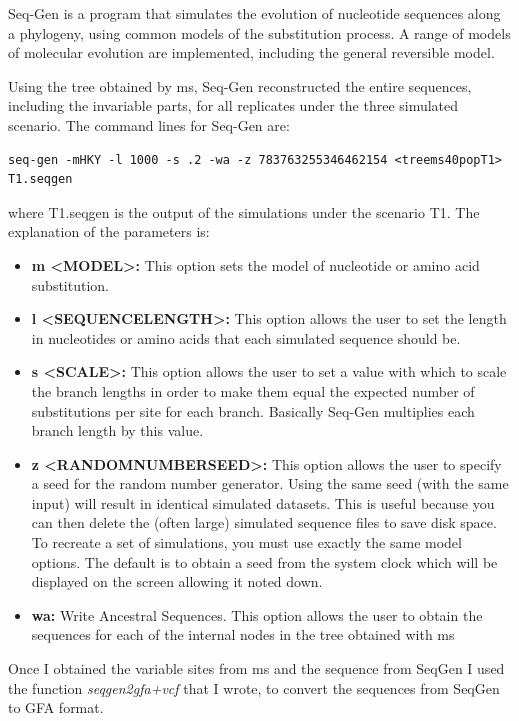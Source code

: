 Seq-Gen \cite{rambaut1997seq} is a program that simulates the evolution of nucleotide sequences along a phylogeny, using common models of the substitution process. A range of models of molecular evolution are implemented, including the general reversible model. 

Using the tree obtained by ms, Seq-Gen reconstructed the entire sequences, including the invariable parts, for all replicates under the three simulated scenario. The command lines for Seq-Gen are: 

\begin{verbatim}
seq-gen -mHKY -l 1000 -s .2 -wa -z 783763255346462154 <treems40popT1> T1.seqgen
\end{verbatim}
where T1.seqgen is the output of the simulations under the scenario T1.
The explanation of the parameters is:

\begin{itemize}
\item\textbf{m <MODEL>:} This option sets the model of nucleotide or amino acid substitution.
\item\textbf{l <SEQUENCELENGTH>:} This option allows the user to set the length in nucleotides or amino acids that each simulated sequence should be.
\item\textbf{s <SCALE>:} This option allows the user to set a value with which to scale the branch lengths in order to make them equal the expected number of substitutions per site for each branch. Basically Seq-Gen multiplies each branch length by this value.
\item\textbf{z <RANDOMNUMBERSEED>:} This option allows the user to specify a seed for the random number generator. Using the same seed (with the same input) will result in identical simulated datasets. This is useful because you can then delete the (often large) simulated sequence files to save disk space. To recreate a set of simulations, you must use exactly the same model options. The default is to obtain a seed from the system clock which will be displayed on the screen allowing it noted down.
\item\textbf{wa:}
Write Ancestral Sequences. This option allows the user to obtain the sequences for each of the internal nodes in the tree obtained with ms \end{itemize}

Once I obtained the variable sites from ms and the sequence from SeqGen I used the \vgpop function \textit{seqgen2gfa+vcf} that I wrote, to convert the sequences from SeqGen to GFA format.  



